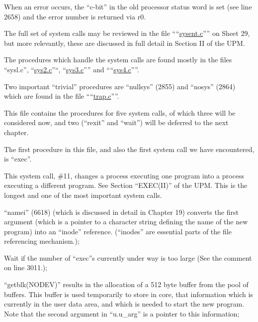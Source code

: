 \item[2776:] When an error occurs, the ``c-bit''
in the old processor status word
is set (see line 2658) and the
error number is returned via r0.
\ed


The full set of system calls may be
reviewed in the file ````\href{./v6/ken/sysent.c}{sysent.c}'''' on
Sheet 29, but more relevantly, these
are discussed in full detail in Section
II of the UPM.

The procedures which handle the system
calls are found mostly in the files
``sysl.c'', ``\href{./v6/ken/sys2.c}{sys2.c}''``, ``\href{./v6/ken/sys3.c}{sys3.c}'''' and
````\href{./v6/ken/sys4.c}{sys4.c}''''.

Two important ``trivial'' procedures are
``nullsys'' (2855) and ``nosys'' (2864)
which are found in the file ````\href{./v6/ken/trap.c}{trap.c}''''.



This file contains the procedures for
five system calls, of which three will
be considered now, and two (``rexit'' and
``wait'') will be deferred to the next
chapter.

The first procedure in this file, and 
also the first system call we have
encountered, is ``exec''.


This system call, \#11, changes a process executing
one program into a process executing a different program.
See Section ``EXEC(II)'' of the UPM.
This is the longest and one of the most
important system calls.

\bd
\item[3034:] ``namei'' (6618) (which is discussed in detail in Chapter 19)
converts the first argument
(which is a pointer to a character
 string defining the name of 
 the new program) into an ``inode''
 reference. (``inodes'' are essential parts of the file
 referencing mechanism.);

\item[3037:] Wait if the number of ``exec''s
 currently under way is too large
 (See the comment on line 3011.);

\item[3040:] ``getblk(NODEV)'' results in the
 allocation of a 512 byte buffer
 from the pool of buffers. This
 buffer is used temporarily to
 store in core, that information
 which is currently in the user
 data area, and which is needed to
 start the new program. Note that
 the second argument in ``u.u\_arg''
 is a pointer to this information;

